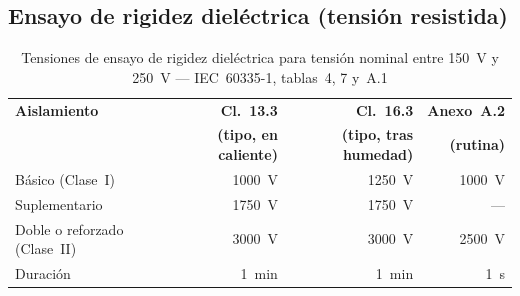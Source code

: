 \subsection{Ensayo de rigidez dieléctrica (tensión resistida)}
\label{subsec:tabla_dielectrica}

\begin{table}[H]
\centering
\caption{Tensiones de ensayo de rigidez dieléctrica para tensión nominal entre \SI{150}{\volt} y \SI{250}{\volt} --- IEC~60335-1, tablas~4, 7 y~A.1}
\label{tab:hipot_tensiones}
\renewcommand{\arraystretch}{1.35}
\small
\begin{tabular}{@{} l r r r @{}}
\toprule
\textbf{Aislamiento}
    & \textbf{Cl.~13.3}
    & \textbf{Cl.~16.3}
    & \textbf{Anexo~A.2} \\
    & \textbf{(tipo, en caliente)}
    & \textbf{(tipo, tras humedad)}
    & \textbf{(rutina)} \\
\midrule
Básico (Clase~I)
    & \SI{1000}{\volt}
    & \SI{1250}{\volt}
    & \SI{1000}{\volt} \\
Suplementario
    & \SI{1750}{\volt}
    & \SI{1750}{\volt}
    & --- \\
Doble o reforzado (Clase~II)
    & \SI{3000}{\volt}
    & \SI{3000}{\volt}
    & \SI{2500}{\volt} \\
\midrule
Duración
    & \SI{1}{\minute}
    & \SI{1}{\minute}
    & \SI{1}{\second} \\
\bottomrule
\end{tabular}
\end{table}

